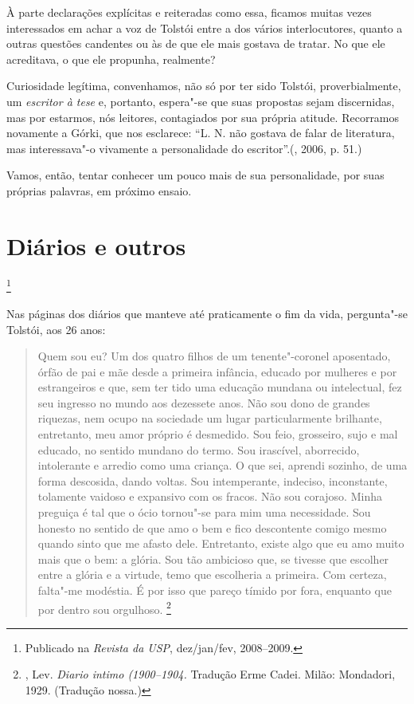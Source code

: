 À parte declarações explícitas e reiteradas como essa, ficamos muitas
vezes interessados em achar a voz de Tolstói entre a dos
vários interlocutores, quanto a outras questões candentes ou às de que
ele mais gostava de tratar. No que ele acreditava, o que ele propunha,
realmente?

Curiosidade legítima, convenhamos, não só por ter sido Tolstói,
proverbialmente, um \emph{escritor à tese} e, portanto, espera"-se que suas
propostas sejam discernidas, mas por estarmos, nós leitores,
contagiados por sua própria atitude. Recorramos novamente a
Górki, que nos esclarece: ``L. N. não gostava
de falar de literatura, mas interessava"-o vivamente a personalidade do
escritor''.(, 2006, p. 51.)

Vamos, então, tentar conhecer um pouco mais de sua personalidade, por
suas próprias palavras, em próximo ensaio.

\chapter{Diários e outros}\footnote{Publicado na \emph{Revista da USP}, dez/jan/fev, 2008--2009.}

Nas páginas dos diários que manteve até praticamente o fim da vida,
pergunta"-se Tolstói, aos 26 anos:

\begin{quote}
Quem sou eu? Um dos quatro filhos de um
tenente"-coronel aposentado, órfão de pai e mãe desde a primeira
infância, educado por mulheres e por estrangeiros e que, sem ter tido
uma educação mundana ou intelectual, fez seu ingresso no mundo aos
dezessete anos. Não sou dono de grandes riquezas, nem ocupo na sociedade
um lugar particularmente brilhante, entretanto, meu amor próprio é
desmedido. Sou feio, grosseiro, sujo e mal educado, no sentido mundano
do termo. Sou irascível, aborrecido, intolerante e arredio como uma
criança. O que sei, aprendi sozinho, de uma forma descosida, dando
voltas. Sou intemperante, indeciso, inconstante, tolamente vaidoso e
expansivo com os fracos. Não sou corajoso. Minha preguiça é tal que o
ócio tornou"-se para mim uma necessidade. Sou honesto no sentido de que
amo o bem e fico descontente comigo mesmo quando sinto que me afasto
dele. Entretanto, existe algo que eu amo muito mais que o bem: a glória.
Sou tão ambicioso que, se tivesse que escolher entre a glória e a
virtude, temo que escolheria a primeira. Com certeza, falta"-me modéstia.
É por isso que pareço tímido por fora, enquanto que por dentro sou
orgulhoso. \footnote{, Lev. \emph{Diario intimo (1900--1904.} Tradução Erme Cadei. Milão: Mondadori, 1929. (Tradução nossa.)}
\end{quote}

